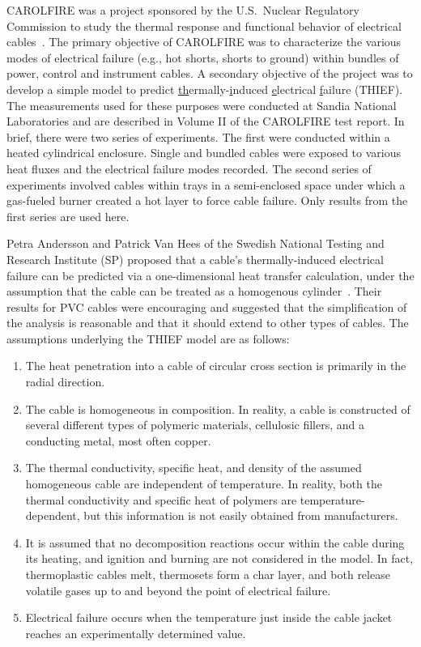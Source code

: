 CAROLFIRE was a project sponsored by the U.S.~Nuclear Regulatory Commission to study the thermal response and functional behavior of electrical cables~\cite{CAROLFIRE}. The primary objective of CAROLFIRE was to characterize the various modes of electrical failure (e.g., hot shorts, shorts to ground) within bundles of power, control and instrument cables. A secondary objective of the project was to develop a simple model to predict \underline{th}ermally-\underline{i}nduced \underline{e}lectrical \underline{f}ailure (THIEF). The measurements used for these purposes were conducted at Sandia National Laboratories and are described in Volume II of the CAROLFIRE test report. In brief, there were two series of experiments. The first were conducted within a heated cylindrical enclosure. Single and bundled cables were exposed to various heat fluxes and the electrical failure modes recorded. The second series of experiments involved cables within trays in a semi-enclosed space under which a gas-fueled burner created a hot layer to force cable failure. Only results from the first series are used here.

Petra Andersson and Patrick Van Hees of the Swedish National Testing and Research Institute (SP) proposed that a cable's thermally-induced electrical failure can be predicted via a one-dimensional heat transfer calculation, under the assumption that the cable can be treated as a homogenous cylinder~\cite{Andersson:2005}. Their results for PVC cables were encouraging and suggested that the simplification of the analysis is reasonable and that it should extend to other types of cables. The assumptions underlying the THIEF model are as follows:
\begin{enumerate}
\item The heat penetration into a cable of circular cross section is primarily in the radial direction.
\item The cable is homogeneous in composition. In reality, a cable is constructed of several different types of polymeric materials, cellulosic fillers, and a conducting metal, most often copper.
\item The thermal conductivity, specific heat, and density of the assumed homogeneous cable are independent of temperature. In reality, both the thermal conductivity and specific heat of polymers are temperature-dependent, but this information is not easily obtained from manufacturers.
\item It is assumed that no decomposition reactions occur within the cable during its heating, and ignition and burning are not considered in the model. In fact, thermoplastic cables melt, thermosets form a char layer, and both release volatile gases up to and beyond the point of electrical failure.
\item Electrical failure occurs when the temperature just inside the cable jacket reaches an experimentally determined value.
\end{enumerate}



